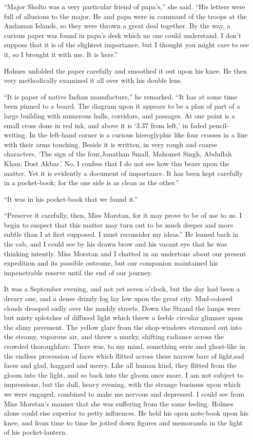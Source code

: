 \documentclass[12pt,english,oneside]{book}
\begin{document}
{}``Major Sholto was a very particular friend of papa's,'' she said.
{}``His letters were full of allusions to the major. He and papa
were in command of the troops at the Andaman Islands, so they were
thrown a great deal together. By the way, a curious paper was found
in papa's desk which no one could understand. I don't suppose that
it is of the slightest importance, but I thought you might care to
see it, so I brought it with me. It is here.''

Holmes unfolded the paper carefully and smoothed it out upon his knee.
He then very methodically examined it all over with his double lens.

{}``It is paper of native Indian manufacture,'' he remarked. {}``It
has at some time been pinned to a board. The diagram upon it appears
to be a plan of part of a large building with numerous halls, corridors,
and passages. At one point is a small cross done in red ink, and above
it is `3.37 from left,' in faded pencil-writing. In the left-hand
corner is a curious hieroglyphic like four crosses in a line with
their arms touching. Beside it is written, in very rough and coarse
characters, `The sign of the four,\mdsh{---}Jonathan Small, Mahomet
Singh, Abdullah Khan, Dost Akbar.' No, I confess that I do not see
how this bears upon the matter. Yet it is evidently a document of
importance. It has been kept carefully in a pocket-book; for the one
side is as clean as the other.''

{}``It was in his pocket-book that we found it.''

{}``Preserve it carefully, then, Miss Morstan, for it may prove to
be of use to us. I begin to suspect that this matter may turn out
to be much deeper and more subtle than I at first supposed. I must
reconsider my ideas.'' He leaned back in the cab, and I could see
by his drawn brow and his vacant eye that he was thinking intently.
Miss Morstan and I chatted in an undertone about our present expedition
and its possible outcome, but our companion maintained his impenetrable
reserve until the end of our journey.

It was a September evening, and not yet seven o'clock, but the day
had been a dreary one, and a dense drizzly fog lay low upon the great
city. Mud-colored clouds drooped sadly over the muddy streets. Down
the Strand the lamps were but misty splotches of diffused light which
threw a feeble circular glimmer upon the slimy pavement. The yellow
glare from the shop-windows streamed out into the steamy, vaporous
air, and threw a murky, shifting radiance across the crowded thoroughfare.
There was, to my mind, something eerie and ghost-like in the endless
procession of faces which flitted across these narrow bars of light,\mdsh{---}sad
faces and glad, haggard and merry. Like all human kind, they flitted
from the gloom into the light, and so back into the gloom once more.
I am not subject to impressions, but the dull, heavy evening, with
the strange business upon which we were engaged, combined to make
me nervous and depressed. I could see from Miss Morstan's manner that
she was suffering from the same feeling. Holmes alone could rise superior
to petty influences. He held his open note-book upon his knee, and
from time to time he jotted down figures and memoranda in the light
of his pocket-lantern.
\end{document}

